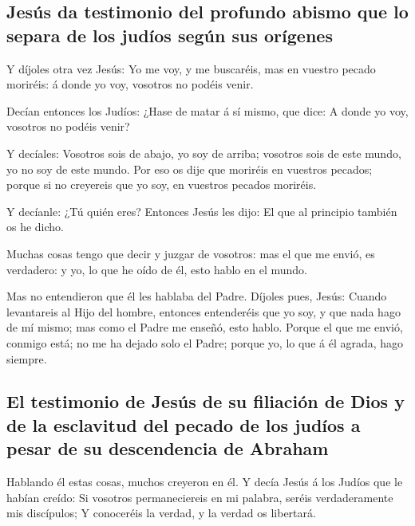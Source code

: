 \hypertarget{jesuxfas-da-testimonio-del-profundo-abismo-que-lo-separa-de-los-juduxedos-seguxfan-sus-oruxedgenes}{%
\subsection{Jesús da testimonio del profundo abismo que lo separa de los
judíos según sus
orígenes}\label{jesuxfas-da-testimonio-del-profundo-abismo-que-lo-separa-de-los-juduxedos-seguxfan-sus-oruxedgenes}}

 Y díjoles otra vez Jesús: Yo me voy, y me buscaréis, mas
en vuestro pecado moriréis: á donde yo voy, vosotros no podéis venir.

 Decían entonces los Judíos: ¿Hase de matar á sí mismo,
que dice: A donde yo voy, vosotros no podéis venir?

 Y decíales: Vosotros sois de abajo, yo soy de arriba;
vosotros sois de este mundo, yo no soy de este mundo. 
Por eso os dije que moriréis en vuestros pecados; porque si no creyereis
que yo soy, en vuestros pecados moriréis.

 Y decíanle: ¿Tú quién eres? Entonces Jesús les dijo: El
que al principio también os he dicho.

 Muchas cosas tengo que decir y juzgar de vosotros: mas
el que me envió, es verdadero: y yo, lo que he oído de él, esto hablo en
el mundo.

 Mas no entendieron que él les hablaba del Padre.
 Díjoles pues, Jesús: Cuando levantareis al Hijo del
hombre, entonces entenderéis que yo soy, y que nada hago de mí mismo;
mas como el Padre me enseñó, esto hablo.  Porque el que
me envió, conmigo está; no me ha dejado solo el Padre; porque yo, lo que
á él agrada, hago siempre.

\hypertarget{el-testimonio-de-jesuxfas-de-su-filiaciuxf3n-de-dios-y-de-la-esclavitud-del-pecado-de-los-juduxedos-a-pesar-de-su-descendencia-de-abraham}{%
\subsection{El testimonio de Jesús de su filiación de Dios y de la
esclavitud del pecado de los judíos a pesar de su descendencia de
Abraham}\label{el-testimonio-de-jesuxfas-de-su-filiaciuxf3n-de-dios-y-de-la-esclavitud-del-pecado-de-los-juduxedos-a-pesar-de-su-descendencia-de-abraham}}

 Hablando él estas cosas, muchos creyeron en él.
 Y decía Jesús á los Judíos que le habían creído: Si
vosotros permaneciereis en mi palabra, seréis verdaderamente mis
discípulos;  Y conoceréis la verdad, y la verdad os
libertará.

